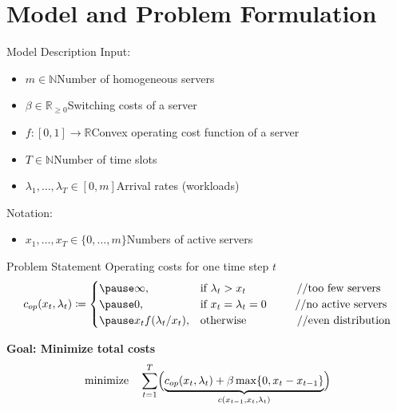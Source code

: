 \documentclass{beamer}
\newcommand{\costs}{c}
\newcommand{\opcosts}{c_{op}}
\newcommand{\fromto}[2]{\{#1,\dotsc,#2\}}
\begin{document}
\section{Model and Problem Formulation}
\begin{frame}{Model Description}
Input:
\begin{itemize}[<+->]
  \item $m\in\mathbb{N}$\dotso Number of homogeneous servers 
  \item $\beta\in\mathbb{R}_{\ge 0}$\dotso Switching costs of a server
  \item $f:[0,1]\rightarrow\mathbb{R}$\dotso Convex operating cost function of a server
  \item $T\in\mathbb{N}$\dotso Number of time slots
  \item $\lambda_1,\dotsc,\lambda_{T}\in[0,m]$\dotso Arrival rates (workloads)
\end{itemize}
\pause[\thebeamerpauses]
Notation:
\begin{itemize}
	\item $x_1,\dotsc,x_{T}\in\fromto{0}{m}$\dotso Numbers of active servers
\end{itemize}
\end{frame}
\begin{frame}{Problem Statement}
Operating costs for one time step $t$
\begin{equation*}
	\opcosts(x_t,\lambda_t)\coloneqq\begin{cases}
	  \pause\infty, & \text{if $\lambda_t>x_t$}\hspace{16mm}\text{//too few servers}\\
          \pause 0, & \text{if $x_t=\lambda_t=0$\hspace{9mm}\text{//no active servers}}\\
	  \pause x_tf(\lambda_t/x_t), & \text{otherwise}\hspace{16mm}\text{//even distribution}
	  \end{cases}
\end{equation*}
\pause
\begin{alertbox}
\centering \textbf{Goal: Minimize total costs}
\pause
\begin{align*}
	\text{minimize}\quad \sum\limits_{t=1}^{T}\Bigl(\underbrace{\opcosts(x_t,\lambda_t)+\beta\max\{0,x_t-x_{t-1}\}}_{\costs(x_{t-1},x_t,\lambda_t)}\Bigr)
\end{align*}
\end{alertbox}
\end{frame}
\end{document}
